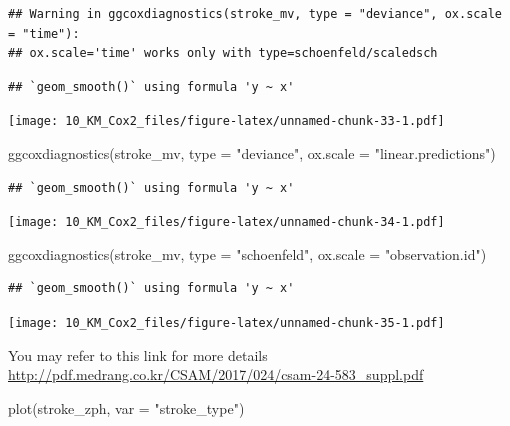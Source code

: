 \documentclass[
  10pt,
]{krantz}
\newenvironment{Shaded}{\begin{snugshade}}{\end{snugshade}}
\newcommand{\AttributeTok}[1]{\textcolor[rgb]{0.77,0.63,0.00}{#1}}
\newcommand{\FunctionTok}[1]{\textcolor[rgb]{0.00,0.00,0.00}{#1}}
\newcommand{\NormalTok}[1]{#1}
\newcommand{\StringTok}[1]{\textcolor[rgb]{0.31,0.60,0.02}{#1}}
\begin{document}
\begin{verbatim}
## Warning in ggcoxdiagnostics(stroke_mv, type = "deviance", ox.scale = "time"):
## ox.scale='time' works only with type=schoenfeld/scaledsch
\end{verbatim}

\begin{verbatim}
## `geom_smooth()` using formula 'y ~ x'
\end{verbatim}

\texttt{[image: 10\_KM\_Cox2\_files/figure-latex/unnamed-chunk-33-1.pdf]}

\begin{Shaded}
\begin{Highlighting}[]
\FunctionTok{ggcoxdiagnostics}\NormalTok{(stroke\_mv, }\AttributeTok{type =} \StringTok{"deviance"}\NormalTok{, }\AttributeTok{ox.scale =} \StringTok{"linear.predictions"}\NormalTok{)}
\end{Highlighting}
\end{Shaded}

\begin{verbatim}
## `geom_smooth()` using formula 'y ~ x'
\end{verbatim}

\texttt{[image: 10\_KM\_Cox2\_files/figure-latex/unnamed-chunk-34-1.pdf]}

\begin{Shaded}
\begin{Highlighting}[]
\FunctionTok{ggcoxdiagnostics}\NormalTok{(stroke\_mv, }\AttributeTok{type =} \StringTok{"schoenfeld"}\NormalTok{, }\AttributeTok{ox.scale =} \StringTok{"observation.id"}\NormalTok{)}
\end{Highlighting}
\end{Shaded}

\begin{verbatim}
## `geom_smooth()` using formula 'y ~ x'
\end{verbatim}

\texttt{[image: 10\_KM\_Cox2\_files/figure-latex/unnamed-chunk-35-1.pdf]}

You may refer to this link for more details \url{http://pdf.medrang.co.kr/CSAM/2017/024/csam-24-583_suppl.pdf}

\begin{Shaded}
\begin{Highlighting}[]
\FunctionTok{plot}\NormalTok{(stroke\_zph, }\AttributeTok{var =} \StringTok{"stroke\_type"}\NormalTok{)}
\end{Highlighting}
\end{Shaded}
\end{document}

